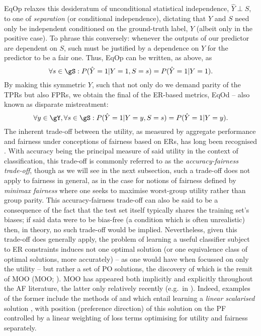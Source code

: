 %
%
\Acf{EqOp} relaxes this desideratum of unconditional statistical independence, \(\hat{Y} \perp S\),
to one of \emph{separation} (or conditional independence), dictating that \(\hat{Y}\) and \(S\)
need only be independent conditioned on the ground-truth label, \(Y\) (albeit only in the positive
case).
%
To phrase this conversely: whenever the outputs of our predictor are dependent on \(S\), such must be
justified by a dependence on \(Y\) for the predictor to be a fair one.
%
Thus, \ac{EqOp} can be written, as above, as
%
\begin{equation}
    \forall s \in \gS: P( \hat{Y}=1|Y=1, S=s ) = P(\hat{Y}=1|Y=1).
\end{equation}
%
%
By making this symmetric \wrt{} \(Y\), such that not only do we demand parity of the \acp{TPR} but
also \acp{FPR}, we obtain the final of the \ac{ER}-based metrics, \ac{EqOd}
\citep{hardt2016equality} -- also known as disparate mistreatment:
%
\begin{equation}
    \forall y \in \gY, \forall s \in \gS: P( \hat{Y}=1|Y=y, S=s ) = P( \hat{Y}=1|Y=y ).
\end{equation}
%
%
The inherent trade-off between the utility, as measured by aggregate performance and fairness under
conceptions of fairness based on \acp{ER}, has long been recognised \citealp{kaplow1999conflict}. 
%
With accuracy being the principal measure of said utility in the context of classification, this
trade-off is commonly referred to as the \emph{accuracy-fairness trade-off}, though as we will see
in the next subsection, such a trade-off does not apply to fairness in general, as in the case for
notions of fairness defined by \emph{minimax fairness} where one seeks to maximise worst-group
utility rather than group parity.
%
This accuracy-fairness trade-off can also be said to be a consequence of the fact that the test set
itself typically shares the training set's biases; if said data were to be bias-free (a condition
which is often unrealistic) then, in theory, no such trade-off would be implied.
%
Nevertheless, given this trade-off does generally apply, the problem of learning a useful
classifier subject to \ac{ER} constraints induces not one optimal solution (or one equivalence
class of optimal solutions, more accurately) -- as one would have when focussed on only the utility
-- but rather a set of \ac{PO} solutions, the discovery of which is the remit of \acl{MOO}
(\ac{MOO}; \citealp{sawaragi1985theory, deb2013multi}). 
%
\Ac{MOO} has appeared both implicitly and explicitly throughout the \ac{AF} literature, the latter
only relatively recently (e.g.\ in \citealp{navon2020learning}). 
%
Indeed, examples of the former include the methods of \citet{louizos2015variational} and
\citet{madras2018learning} which entail learning a \emph{linear scalarised} solution
\citep{boyd2004convex},  with position (preference direction) of this solution on the \acf{PF}
controlled by a linear weighting of loss terms optimising for utility and fairness separately.
%
